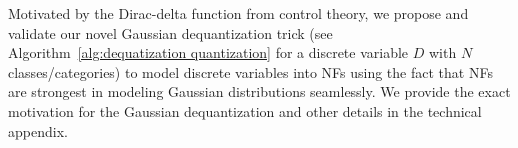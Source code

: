 \documentclass[letterpaper]{article} %
\begin{document}
Motivated by the Dirac-delta function from control theory, we propose and validate our novel Gaussian dequantization trick (see Algorithm~\ref{alg:dequatization quantization} for a discrete variable $D$ with $N$ classes/categories) to model discrete variables into NFs using the fact that NFs are strongest in modeling Gaussian distributions seamlessly. We provide the exact motivation for the Gaussian dequantization and other details in the technical appendix.
\end{document}
